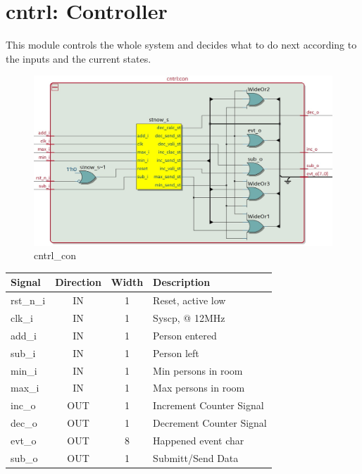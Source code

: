 \documentclass[12pt,a4 paper] {report}
\begin{document}
\newpage

\section{cntrl: Controller}
This module controls the whole system and decides what to do next according to the inputs and the current states.
\begin{figure}[h]
	\centering	
	\includegraphics[scale=0.25]{../png/cntrl_con.png}
	\caption{cntrl\_con}
\end{figure}
\begin{center}
	\begin{tabular}{ | p{2cm} | c | c | p{5cm} |}
		\hline
		\textbf{Signal} & \textbf{Direction} & \textbf{Width} & \textbf{Description} \\
		\hline	
		rst\_n\_i & IN & 1 & Reset, active low \\
		\hline
		clk\_i & IN & 1 & Syscp, @ 12MHz \\
		\hline
		add\_i & IN & 1 & Person entered \\
		\hline
		sub\_i & IN & 1 & Person left \\
		\hline
		min\_i & IN & 1 & Min persons in room \\
		\hline
		max\_i & IN & 1 & Max persons in room \\
		\hline
		inc\_o & OUT & 1 & Increment Counter Signal \\
		\hline
		dec\_o & OUT & 1 & Decrement Counter Signal \\
		\hline
		evt\_o & OUT & 8 & Happened event char \\
		\hline
		sub\_o & OUT & 1 & Submitt/Send Data \\
		\hline
	\end{tabular}
\end{center}
\end{document}
